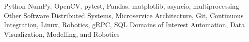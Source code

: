 \begin{cvskills}
    \cvskill
       {Python}
       {NumPy, OpenCV, pytest, Pandas, matplotlib, asyncio, multiprocessing}
    \cvskill
       {Other Software}
       {Distributed Systems, Microservice Architecture, Git,
	Continuous Integration, Linux, Robotics, gRPC, SQL}
    \cvskill
       {Domains of Interest}
       {Automation, Data Visualization, Modelling, and Robotics}
\end{cvskills}
